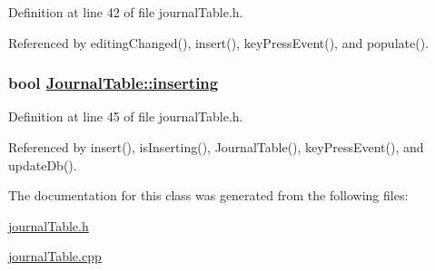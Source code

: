 Definition at line 42 of file journal\-Table.h.

Referenced by editing\-Changed(), insert(), key\-Press\-Event(), and populate().\hypertarget{classJournalTable_r4}{
\subsubsection[inserting]{\setlength{\rightskip}{0pt plus 5cm}bool \hyperlink{classJournalTable_r4}{Journal\-Table::inserting}}}
\label{classJournalTable_r4}


Definition at line 45 of file journal\-Table.h.

Referenced by insert(), is\-Inserting(), Journal\-Table(), key\-Press\-Event(), and update\-Db().

The documentation for this class was generated from the following files:\begin{CompactItemize}
\item 
\hyperlink{journalTable_8h}{journal\-Table.h}\item 
\hyperlink{journalTable_8cpp}{journal\-Table.cpp}\end{CompactItemize}
